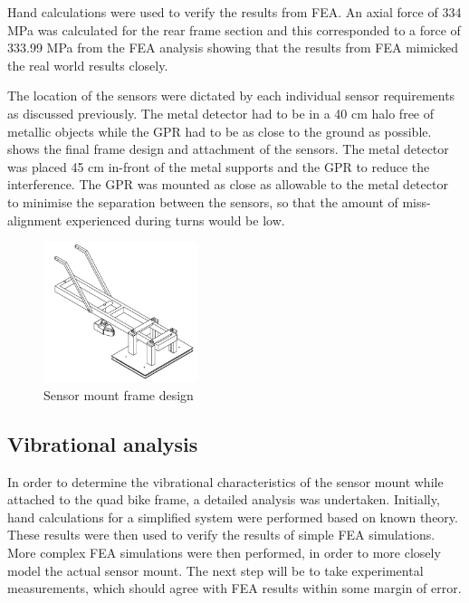 \documentclass[main.tex]{subfiles}
\begin{document}
Hand calculations were used to verify the results from FEA. An axial force of 334 MPa was calculated for the rear frame section and this corresponded to a force of 333.99 MPa from the FEA analysis showing that the results from FEA mimicked the real world results closely. 

The location of the sensors were dictated by each individual sensor requirements as discussed previously. The metal detector had to be in a 40 cm halo free of metallic objects while the GPR had to be as close to the ground as possible.  shows the final frame design and attachment of the sensors. The metal detector was placed 45 cm in-front of the metal supports and the GPR to reduce the interference. The GPR was mounted as close as allowable to the metal detector to minimise the separation between the sensors, so that the amount of miss-alignment experienced during turns would be low.  

\begin{figure}[ht]
\includegraphics[width=0.4\textwidth]{4-DetailedDesign/frame.PNG}
\centering
\caption{Sensor mount frame design} 
\end{figure} 

\subsection{Vibrational analysis}
In order to determine the vibrational characteristics of the sensor mount while attached to the quad bike frame, a detailed analysis was undertaken. Initially, hand calculations for a simplified system were performed based on known theory. These results were then used to verify the results of simple FEA simulations. More complex FEA simulations were then performed, in order to more closely model the actual sensor mount. The next step will be to take experimental measurements, which should agree with FEA results within some margin of error. 
 
\end{document}
